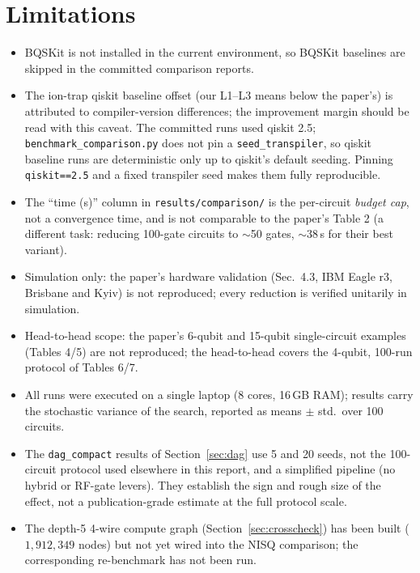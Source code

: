 \documentclass[11pt,a4paper]{article}
\begin{document}
\section{Limitations}
\label{sec:limitations}
\begin{itemize}
    \item BQSKit is not installed in the current environment, so BQSKit
          baselines are skipped in the committed comparison reports.
    \item The ion-trap qiskit baseline offset (our L1--L3 means below the
          paper's) is attributed to compiler-version differences; the
          improvement margin should be read with this caveat. The committed
          runs used qiskit 2.5; \texttt{benchmark\_comparison.py} does not pin
          a \texttt{seed\_transpiler}, so qiskit baseline runs are
          deterministic only up to qiskit's default seeding. Pinning
          \texttt{qiskit==2.5} and a fixed transpiler seed makes them fully
          reproducible.
    \item The ``time (s)'' column in \texttt{results/comparison/} is the
          per-circuit \emph{budget cap}, not a convergence time, and is not
          comparable to the paper's Table 2 (a different task: reducing
          100-gate circuits to $\sim$50 gates, $\sim$38\,s for their best
          variant).
    \item Simulation only: the paper's hardware validation (Sec.\ 4.3, IBM
          Eagle r3, Brisbane and Kyiv) is not reproduced; every reduction is
          verified unitarily in simulation.
    \item Head-to-head scope: the paper's 6-qubit and 15-qubit single-circuit
          examples (Tables 4/5) are not reproduced; the head-to-head covers the
          4-qubit, 100-run protocol of Tables 6/7.
    \item All runs were executed on a single laptop (8 cores, 16\,GB RAM);
          results carry the stochastic variance of the search, reported as
          means $\pm$ std.\ over 100 circuits.
    \item The \texttt{dag\_compact} results of Section~\ref{sec:dag} use 5
          and 20 seeds, not the 100-circuit protocol used elsewhere in this
          report, and a simplified pipeline (no hybrid or RF-gate levers).
          They establish the sign and rough size of the effect, not a
          publication-grade estimate at the full protocol scale.
    \item The depth-5 4-wire compute graph (Section~\ref{sec:crosscheck}) has
          been built ($1{,}912{,}349$ nodes) but not yet wired into the NISQ
          comparison; the corresponding re-benchmark has not been run.
\end{itemize}
\end{document}
